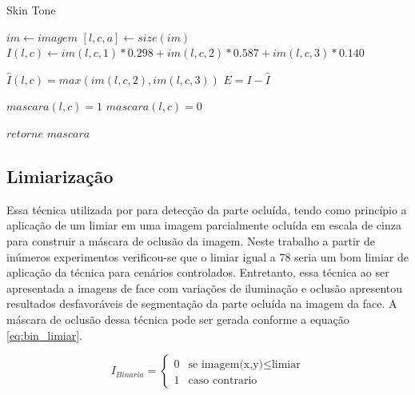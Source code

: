 \begin{algorithm}[H]
\caption{Skin Tone}
\label{alg:algoritmo_skin}
\begin{algorithmic}[1]

\State $im \gets imagem$
\State $[l,c,a] \gets size(im)$
      \State $I(l,c) \gets im(l,c,1)*0.298 + im(l,c,2)*0.587 + im(l,c,3)*0.140$
     
	\EndFor
\EndFor

      \State $\hat{I}(l,c) = max( im (l,c,2), im(l,c,3))  $ 
     \EndFor
\EndFor
\State $E = I - \hat{I}$
     
     
            \State $mascara(l,c) = 1$
      \Else
      		\State $mascara(l,c) = 0$
             
    \EndIf
      
	\EndFor
\EndFor
\State $retorne$ $mascara$

\end{algorithmic}
\end{algorithm}





\subsection{Limiarização}

Essa técnica utilizada por  para detecção da parte ocluída, tendo como princípio a aplicação de um limiar em uma imagem parcialmente ocluída em escala de cinza para construir a máscara de oclusão da imagem. 
Neste trabalho a partir de inúmeros experimentos verificou-se que o limiar igual a 78 seria um bom limiar de aplicação da técnica para cenários controlados. Entretanto, essa técnica ao ser apresentada a imagens de face com variações de iluminação e oclusão apresentou resultados desfavoráveis de segmentação da parte ocluída na imagem da face. A máscara de oclusão dessa técnica pode ser gerada conforme a equação \ref{eq:bin_limiar}.

\begin{equation}
\label{eq:bin_limiar}
I_{Binaria} = \left\{\begin{matrix}
0 &  \textrm{se imagem(x,y)} \leq \textrm{limiar} \\ 
1 & \textrm{caso contrario}
\end{matrix}\right.
\end{equation}

